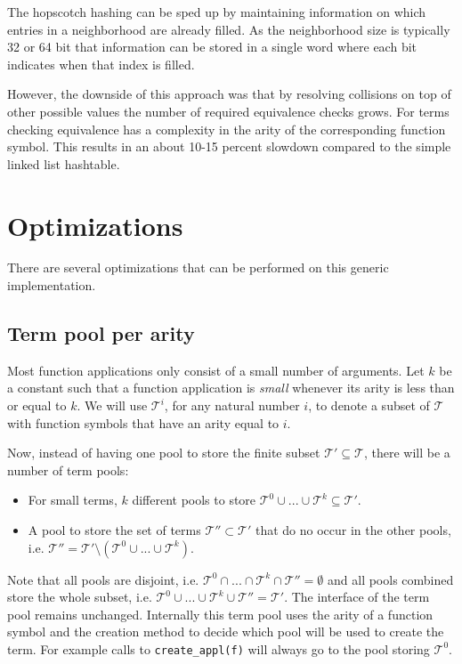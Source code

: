 \documentclass[10pt,a4paper]{article}
\newcommand{\terms}{\mathcal{T}}
\begin{document}
The hopscotch hashing can be sped up by maintaining information on which entries in a neighborhood are already filled.
As the neighborhood size is typically 32 or 64 bit that information can be stored in a single word where each bit indicates when that index is filled.

However, the downside of this approach was that by resolving collisions on top of other possible values the number of required equivalence checks grows.
For terms checking equivalence has a complexity in the arity of the corresponding function symbol.
This results in an about 10-15 percent slowdown compared to the simple linked list hashtable.

\section{Optimizations}\label{section:optimizations}

There are several optimizations that can be performed on this generic implementation.

\subsection{Term pool per arity}

Most function applications only consist of a small number of arguments. 
Let $k$ be a constant such that a function application is \emph{small} whenever its arity is less than or equal to $k$. 
We will use $\terms^i$, for any natural number $i$, to denote a subset of $\terms$ with function symbols that have an arity equal to $i$. 

Now, instead of having one pool to store the finite subset $\terms' \subseteq \terms$, there will be a number of term pools:

\begin{itemize}
  \item For small terms, $k$ different pools to store $\terms^0 \cup ... \cup \terms^k \subseteq \terms'$.
    
  \item A pool to store the set of terms $\terms'' \subset \terms'$ that do no occur in the other pools, i.e. $\terms'' = \terms' \setminus (\terms^0 \cup ... \cup \terms^k)$.
\end{itemize}

\noindent Note that all pools are disjoint, i.e. $\terms^0 \cap ... \cap \terms^k \cap \terms'' = \emptyset$ and all pools combined store the whole subset, i.e. $\terms^0 \cup ... \cup \terms^k \cup \terms'' = \terms'$. 
The interface of the term pool remains unchanged. 
Internally this term pool uses the arity of a function symbol and the creation method to decide which pool will be used to create the term. 
For example calls to \texttt{create\_appl(f)} will always go to the pool storing $\terms^0$.
\end{document}
